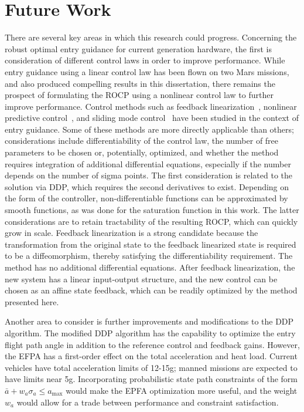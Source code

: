 
\section{Future Work}
There are several key areas in which this research could progress. Concerning the robust optimal entry guidance for current generation hardware, the first is consideration of different control laws in order to improve performance.
While entry guidance using a linear control law has been flown on two Mars missions, and also produced compelling results in this dissertation, there remains the prospect of formulating the ROCP using a nonlinear control law to further improve performance. Control methods such as feedback linearization~\cite{FeedbackLinearization}, nonlinear predictive control~\cite{NMPC, JoelController}, and sliding mode control~\cite{SlidingModeObserver,SlidingModeEG1} have been studied in the context of entry guidance. Some of these methods are more directly applicable than others; considerations include differentiability of the control law, the number of free parameters to be chosen or, potentially, optimized, and whether the method requires integration of additional differential equations, especially if the number depends on the number of sigma points. The first consideration is related to the solution via DDP, which requires the second derivatives to exist. Depending on the form of the controller, non-differentiable functions can be approximated by smooth functions, as was done for the saturation function in this work. The latter considerations are to retain tractability of the resulting ROCP, which can quickly grow in scale.
Feedback linearization is a strong candidate because the transformation from the original state to the feedback linearized state is required to be a diffeomorphism, thereby satisfying the differentiability requirement. The method has no additional differential equations. After feedback linearization, the new system has a linear input-output structure, and the new control can be chosen as an affine state feedback, which can be readily optimized by the method presented here.

Another area to consider is further improvements and modifications to the DDP algorithm. The modified DDP algorithm has the capability to optimize the entry flight path angle in addition to the reference control and feedback gains. However, the EFPA has a first-order effect on the total acceleration and heat load. Current vehicles have total acceleration limits of 12-15g; manned missions are expected to have limits near 5g. Incorporating probabilistic state path constraints of the form $\bar{a} + w_a\sigma_a \le a_{\max}$ would make the EPFA optimization more useful, and the weight $w_a$ would allow for a trade between performance and constraint satisfaction. 

